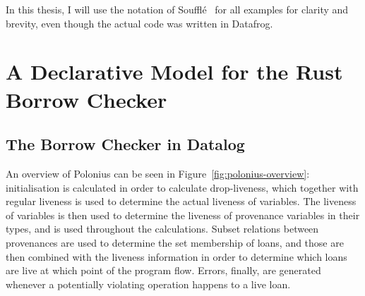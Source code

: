 \documentclass[11pt,a4paper,twoside,openany]{report}
\newcommand{\fixme}[1] {{\color{red}#1}}
\begin{document}
In this thesis, I will use the notation of Souffl{\'e}~\cite{scholz_fast_2016}
for all examples for clarity and brevity, even though the actual code was
written in Datafrog.

\chapter{A Declarative Model for the Rust Borrow Checker}
\label{cha:investigation}

\section{The Borrow Checker in Datalog}\label{sec:borr-check-datal}

An overview of Polonius can be seen in Figure~\ref{fig:polonius-overview}:
initialisation is calculated in order to calculate drop-liveness, which together
with regular liveness is used to determine the actual liveness of variables. The
liveness of variables is then used to determine the liveness of provenance
variables in their types, and is used throughout the calculations. Subset
relations between provenances are used to determine the set membership of loans,
and those are then combined with the liveness information in order to determine
which loans are live at which point of the program flow. Errors, finally, are
generated whenever a potentially violating operation happens to a live loan.
\end{document}
